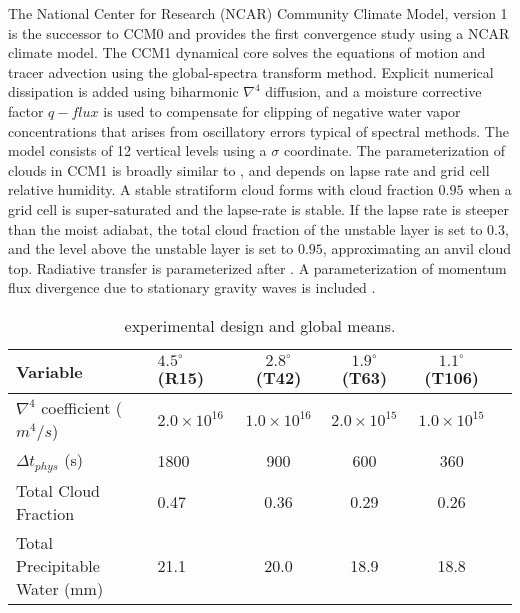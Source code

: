 The National Center for Research (NCAR) Community Climate Model, version 1 \citep{CCM1} is the successor to CCM0 and \cite{KW1991JGR} provides the first convergence study using a NCAR climate model. The CCM1 dynamical core solves the equations of motion and tracer advection using the global-spectra transform method. Explicit numerical dissipation is added using biharmonic $\nabla^{4}$ diffusion, and a moisture corrective factor $q-flux$ is used to compensate for clipping of negative water vapor concentrations that arises from oscillatory errors typical of spectral methods. The model consists of 12 vertical levels using a $\sigma$ coordinate. The parameterization of clouds in CCM1 is broadly similar to \cite{METAL1965MWR}, and depends on lapse rate and grid cell relative humidity. A stable stratiform cloud forms with cloud fraction $0.95$  when a grid cell is super-saturated and the lapse-rate is stable. If the lapse rate is steeper than the moist adiabat, the total cloud fraction of the unstable layer is set to $0.3$, and the level above the unstable layer is set to $0.95$, approximating an anvil cloud top. Radiative transfer is parameterized after \cite{CCM1RAD}. A parameterization of momentum flux divergence due to stationary gravity waves is included \citep{M1987JAS}. 

 \begin{table}
 \caption{\cite{KW1991JGR} experimental design and global means.}
 \centering
 \scriptsize
 \begin{tabular}{llcccc}
 \hline
 Variable & $4.5^{\circ}$ (R15) & $2.8^{\circ}$ (T42) & $1.9^{\circ}$ (T63)  & $1.1^{\circ}$ (T106) \\
 \hline
   $\nabla^{4}$ coefficient ($m^4/s$) & $2.0 \times 10^{16}$ & $1.0 \times 10^{16}$ & $2.0 \times 10^{15}$ & $1.0 \times 10^{15}$ \\
   $\Delta t_{phys}$ (s) & 1800 & 900 & 600 & 360 \\
   Total Cloud Fraction & 0.47 & 0.36 & 0.29 & 0.26 \\
   Total Precipitable Water (mm) & 21.1 & 20.0 & 18.9 & 18.8 \\
 \hline
 \end{tabular}
 \label{tbl:table1-1}
 \end{table}

